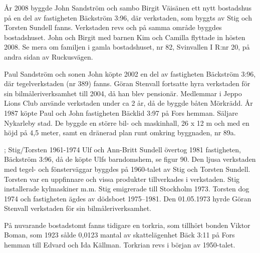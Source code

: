 
%
År 2008 byggde John Sandström och sambo Birgit Väisänen ett nytt bostadshus på en del av fastigheten Bäckström 3:96, där verkstaden, som byggts av Stig och Torsten Sundell fanns. Verkstaden revs och på 	samma område byggdes bostadshuset. John och Birgit med barnen Kim och Camilla flyttade in hösten 2008. Se mera om familjen i gamla bostadshuset, nr 82, Svinvallen I R:nr 20, på andra sidan av Ruckusvägen.


%
Paul Sandström och sonen John köpte 2002 en del av fastigheten Bäckström 3:96, där tegelverkstaden (nr 389) fanns. Göran Stenvall fortsatte hyra	verkstaden för sin bilmåleriverksamhet till 2004, då han blev pensionär. Medlemmar i Jeppo Lions Club använde verkstaden under ca 2 år, då de 	byggde båten Mörkrädd. År 1987 köpte Paul och John fastigheten Bäcklid 3:97 på Fors hemman. Säljare Nykarleby stad. De byggde en större bil- och maskinhall, 26 x 12 m och med en höjd på 4,5 meter, samt en dränerad plan runt omkring byggnaden, nr 89a.


%
; Stig/Torsten	1961-1974
Ulf och Ann-Britt Sundell övertog 1981 fastigheten, Bäckström 3:96, då de köpte Ulfs barndomshem, se figur 90. Den ljusa verkstaden med tegel- och fönsterväggar byggdes på 1960-talet av Stig och Torsten Sundell. Torsten var en uppfinnare och vissa produkter tillverkades i 	verkstaden. Stig installerade kylmaskiner m.m. Stig emigrerade till Stockholm 1973. Torsten dog 1974 och fastigheten ägdes av dödsboet 1975--1981. Den 01.05.1973 hyrde Göran Stenvall verkstaden för sin bilmåleriverksamhet.


%
På nuvarande bostadstomt fanns tidigare en torkria, som tillhört bonden	Viktor Boman, som 1923 sålde 0,0123 mantal av skattelägenhet Bäck 3:11 på 	Fors hemman till Edvard och Ida Källman. Torkrian revs i början av	1950-talet.



%



